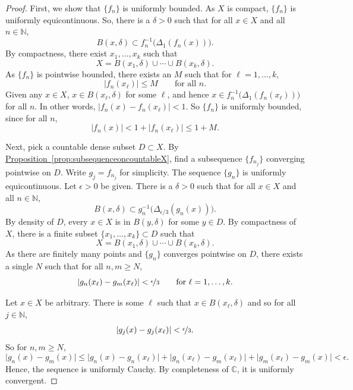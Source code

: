 \documentclass[12pt,openany]{book}
\newcommand{\sabs}[1]{\lvert {#1} \rvert}
\newcommand{\C}{{\mathbb{C}}}
\newcommand{\N}{{\mathbb{N}}}
\theoremstyle{plain}
\theoremstyle{remark}
\theoremstyle{definition}
\theoremstyle{exercise}
\theoremstyle{example}
\newcommand{\propref}[1]{\hyperref[#1]{Proposition~\ref*{#1}}}
\begin{document}
\begin{proof}
First, we show that $\{ f_n \}$ is uniformly bounded.
As $X$ is compact, $\{ f_n \}$ is uniformly
equicontinuous.
So,
there is a $\delta > 0$
such that
for all $x \in X$ and all $n \in \N$,
\begin{equation*}
B(x,\delta) \subset f_n^{-1}\bigl(\Delta_1(f_n(x))\bigr) .
\end{equation*}
By compactness,
there exist $x_1,\ldots,x_k$ such that
\begin{equation*}
X = 
B(x_1,\delta)
\cup \cdots \cup
B(x_k,\delta) .
\end{equation*}
As $\{ f_n \}$ is pointwise bounded, there exists an $M$
such that for $\ell=1,\ldots,k$,
\begin{equation*}
\sabs{f_n(x_\ell)} \leq M \qquad \text{for all } n.
\end{equation*}
Given any
$x \in X$, $x \in B(x_\ell,\delta)$ for some $\ell$, and
hence
$x \in f_n^{-1}\bigl(\Delta_1(f_n(x_\ell))\bigr)$
for all $n$.
In other words,
$\sabs{f_n(x)-f_n(x_\ell)} < 1$.  So $\{ f_n \}$ is uniformly bounded,
since for all $n$,
\begin{equation*}
\sabs{f_n(x)} < 1+ \sabs{f_n(x_\ell)} \leq 1+M .
\end{equation*}

Next, pick a countable dense subset $D \subset X$.
By \propref{prop:subsequenceoncountableX}, find
a subsequence $\{ f_{n_j} \}$ converging pointwise on $D$.
Write $g_j = f_{n_j}$ for simplicity.
The sequence $\{ g_n \}$ is 
uniformly equicontinuous.
Let $\epsilon > 0$ be given.  There is a $\delta > 0$
such that for all $x \in X$ and all $n \in \N$,
\begin{equation*}
B(x,\delta) \subset g_n^{-1}\bigl(\Delta_{\epsilon/3}(g_n(x))\bigr).
\end{equation*}
By density of $D$, every $x \in X$ is in $B(y,\delta)$
for some $y \in D$.  By compactness of $X$,
there is a finite subset $\{ x_1,\ldots,x_k \} \subset D$
such that
\begin{equation*}
X = 
B(x_1,\delta)
\cup \cdots \cup
B(x_k,\delta) .
\end{equation*}
As there are finitely many points and $\{ g_n \}$
converges pointwise on $D$, there exists a single $N$ such that for 
all $n,m \geq N$,
\begin{equation*}
\sabs{g_n(x_\ell)-g_m(x_\ell)} < \nicefrac{\epsilon}{3}
 \qquad \text{for } \ell=1,\ldots,k.
\end{equation*}

Let $x \in X$ be arbitrary.  There is some $\ell$ such that
$x \in B(x_\ell,\delta)$ and so for all $j \in \N$,
\begin{equation*}
\sabs{g_j(x)-g_j(x_\ell)} < \nicefrac{\epsilon}{3}.
\end{equation*}
So for $n,m \geq N$,
\begin{equation*}
\sabs{g_n(x)-g_m(x)} \leq
\sabs{g_n(x)-g_n(x_\ell)} +
\sabs{g_n(x_\ell)-g_m(x_\ell)} +
\sabs{g_m(x_\ell)-g_m(x)} <
\epsilon .
\end{equation*}
Hence, the sequence is uniformly Cauchy.  By completeness of $\C$,
it is uniformly convergent.
\end{proof}
\end{document}
